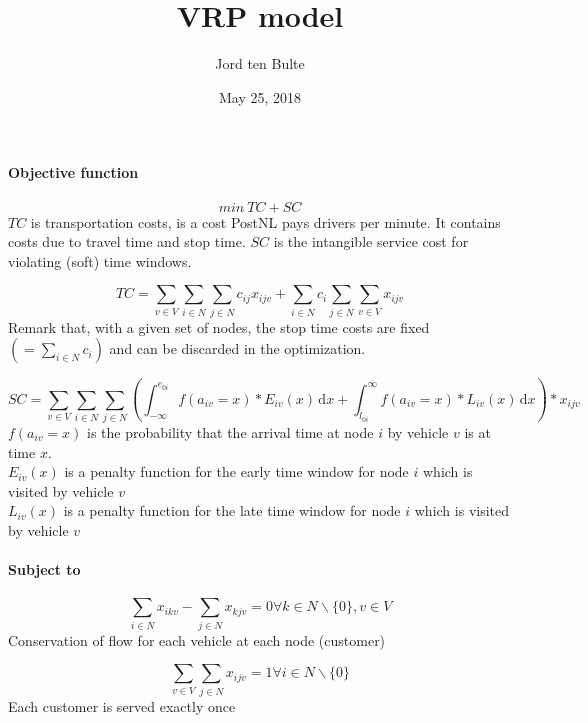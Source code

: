 \documentclass[a4paper,10pt,twoside]{report}
\title{VRP model}\let\Title\@title
\author{Jord ten Bulte}          \let\Author\@author
\date{May 25, 2018}           \let\Date\@date
\begin{document}
\paragraph*{Objective function}
\begin{equation}
min\ TC + SC
\end{equation}
$TC$ is transportation costs, is a cost PostNL pays drivers per minute. It contains costs due to travel time and stop time. $SC$ is the intangible service cost for violating (soft) time windows.

\begin{equation}
TC = \displaystyle\sum_{v \in V}\displaystyle\sum_{i \in N}\displaystyle\sum_{j \in N} c_{ij} x_{ijv} + \displaystyle\sum_{i \in N} c_i \displaystyle\sum_{j \in N} \displaystyle\sum_{v \in V} x_{ijv}
\end{equation}
Remark that, with a given set of nodes, the stop time costs are fixed $(= \sum_{i \in N} c_i)$ and can be discarded in the optimization.

\begin{equation}
SC = \displaystyle\sum_{v \in V}\displaystyle\sum_{i \in N} \displaystyle\sum_{j \in N} \left(\int_{-\infty}^{e_{0i}} f(a_{iv} = x)*E_{iv}(x)\,\mathrm{d}x + \int_{l_{0i}}^{\infty} f(a_{iv} = x)*L_{iv}(x)\,\mathrm{d}x\right)*x_{ijv}
\end{equation}
$f(a_{iv} = x)$ is the probability that the arrival time at node $i$ by vehicle $v$ is at time $x$. \\
$E_{iv}(x)$ is a penalty function for the early time window for node $i$ which is visited by vehicle $v$\\
$L_{iv}(x)$ is a penalty function for the late time window for node $i$ which is visited by vehicle $v$\\


\paragraph*{Subject to}
\begin{equation}
\displaystyle\sum_{i \in N} x_{ikv} - \displaystyle\sum_{j \in N} x_{kjv} = 0 \forall k \in N\backslash\{0\}, v \in V
\end{equation}
Conservation of flow for each vehicle at each node (customer)

\begin{equation}
\displaystyle\sum_{v \in V} \displaystyle\sum_{j \in N} x_{ijv} = 1 \forall i \in N\backslash\{0\}
\end{equation}
Each customer is served exactly once
\end{document}
